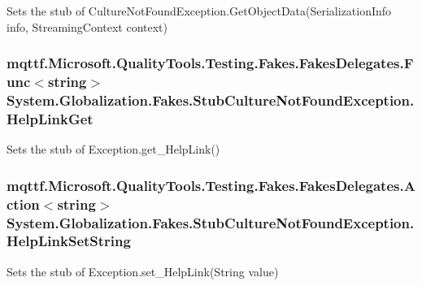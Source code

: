 Sets the stub of Culture\-Not\-Found\-Exception.\-Get\-Object\-Data(\-Serialization\-Info info, Streaming\-Context context)

\hypertarget{class_system_1_1_globalization_1_1_fakes_1_1_stub_culture_not_found_exception_a1b33fdecaaff84d9504105f5d52b2a84}{
\subsubsection[{Help\-Link\-Get}]{\setlength{\rightskip}{0pt plus 5cm}mqttf.\-Microsoft.\-Quality\-Tools.\-Testing.\-Fakes.\-Fakes\-Delegates.\-Func$<$string$>$ System.\-Globalization.\-Fakes.\-Stub\-Culture\-Not\-Found\-Exception.\-Help\-Link\-Get}}\label{class_system_1_1_globalization_1_1_fakes_1_1_stub_culture_not_found_exception_a1b33fdecaaff84d9504105f5d52b2a84}


Sets the stub of Exception.\-get\-\_\-\-Help\-Link()

\hypertarget{class_system_1_1_globalization_1_1_fakes_1_1_stub_culture_not_found_exception_a09acfd525aa0cb30ee9d8d223a3ab79b}{
\subsubsection[{Help\-Link\-Set\-String}]{\setlength{\rightskip}{0pt plus 5cm}mqttf.\-Microsoft.\-Quality\-Tools.\-Testing.\-Fakes.\-Fakes\-Delegates.\-Action$<$string$>$ System.\-Globalization.\-Fakes.\-Stub\-Culture\-Not\-Found\-Exception.\-Help\-Link\-Set\-String}}\label{class_system_1_1_globalization_1_1_fakes_1_1_stub_culture_not_found_exception_a09acfd525aa0cb30ee9d8d223a3ab79b}


Sets the stub of Exception.\-set\-\_\-\-Help\-Link(\-String value)

